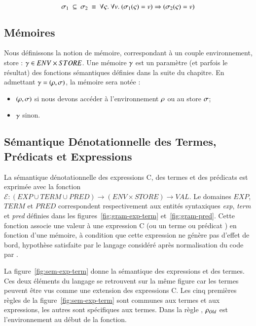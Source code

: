 \[
\sigma_1~\subseteq~\sigma_2~\equiv~
\forall \varsigma.~\forall v.
~(\sigma_1(\varsigma)=v) \Rightarrow (\sigma_2(\varsigma)=v)
\]


\subsection{Mémoires}


Nous définissons la notion de mémoire, correspondant à un couple environnement,
store : $\gamma \in ENV \times STORE$.
Une mémoire $\gamma$ est un paramètre (et parfois le résultat) des fonctions
sémantiques définies dans la suite du chapitre.
En admettant $\gamma = (\rho, \sigma)$, la mémoire sera notée :
\begin{itemize}
\item $(\rho, \sigma)$ si nous devons accéder à l'environnement $\rho$ ou au
  store $\sigma$;
\item $\gamma$ sinon.
\end{itemize}


\subsection{Sémantique Dénotationnelle des Termes, Prédicats et Expressions}



La sémantique dénotationnelle des expressions C, des termes et des prédicats
\eacsl est exprimée avec la fonction
$\mathcal{E} : (EXP \cup TERM \cup PRED) \rightarrow (ENV \times STORE) \rightarrow VAL$.
Le domaines $EXP$, $TERM$ et $PRED$ correspondent respectivement aux entités
syntaxiques \textit{exp}, \textit{term} et \textit{pred} définies dans les
figures~\ref{fig:gram-exp-term} et~\ref{fig:gram-pred}.
Cette fonction associe une valeur à une expression C (ou un terme ou prédicat
\eacsl) en fonction d'une mémoire, à condition que cette expression ne
génère pas d'effet de bord, hypothèse satisfaite par le langage considéré après
normalisation du code par \framac.

La figure~\ref{fig:sem-exp-term} donne la sémantique des expressions et des
termes.
Ces deux éléments du langage se retrouvent sur la même figure car les termes
peuvent être vus comme une extension des expressions C.
Les cinq premières règles de la figure~\ref{fig:sem-exp-term} sont communes aux
termes et aux expressions, les autres sont spécifiques aux termes.
Dans la règle , $\rho_{Old}$ est l'environnement au début de la
fonction.

